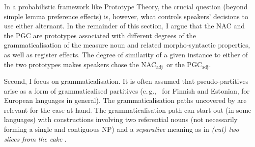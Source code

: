 \documentclass[USenglish]{article}
\newcommand{\eg}{e.\,g.,}
\newcommand{\Sub}[1]{\ensuremath{\mathrm{_{#1}}}}
\newcommand{\NACa}{NAC\Sub{adj}}
\newcommand{\PGCa}{PGC\Sub{adj}}
\begin{document}

In a probabilistic framework like Prototype Theory, the crucial question (beyond simple lemma preference effects) is, however, what controls speakers' decisions to use either alternant. 
In the remainder of this section, I argue that the NAC and the PGC are prototypes associated with different degrees of the grammaticalisation of the measure noun and related morpho-syntactic properties, as well as register effects.
The degree of similarity of a given instance to either of the two prototypes makes speakers chose the \NACa\ or the \PGCa.

Second, I focus on grammaticalisation.
It is often assumed that pseudo-partitives arise as a form of grammaticalised partitives (\eg\ \citealp[536--539]{Koptjevskaja2001} for Finnish and Estonian, \citealp[559]{Koptjevskaja2001} for European languages in general).
%
%
%
%
The grammaticalisation paths uncovered by \citet[esp.\ 526--530]{Koptjevskaja2001} are relevant for the case at hand.
The grammaticalisation path can start out (in some languages) with constructions involving two referential nouns (not necessarily forming a single and contiguous NP) and a \textit{separative} meaning as in \textit{(cut) two slices from the cake} \citep[535]{Koptjevskaja2001}.
\end{document}
